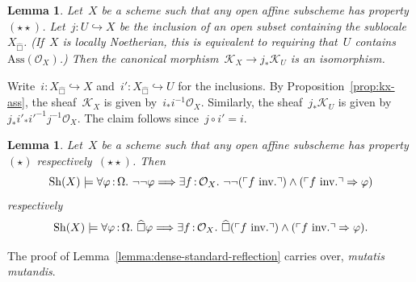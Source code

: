 \documentclass[10pt,reqno,a4paper]{amsbook}
\makeatletter
\theoremstyle{definition}
\theoremstyle{plain}
\newtheorem{lemma}[defn]{Lemma}
\theoremstyle{remark}
\renewcommand{\O}{\mathcal{O}}
\newcommand{\K}{\mathcal{K}}
\newcommand{\Sh}{\mathrm{Sh}}
\newcommand{\Ass}{\mathrm{Ass}}
\newcommand{\?}{\,{:}\,}
\renewcommand{\_}{\mathpunct{.}\,}
\newcommand{\speak}[1]{\ulcorner\text{\textnormal{#1}}\urcorner}
\newcommand{\sdense}{{\widehat\Box}}
\newcommand{\inv}{inv.\@}
\renewenvironment{proof}[1][\proofname]{\par
  \pushQED{\qed}%
  \normalfont \topsep6\p@\@plus6\p@\relax
  \trivlist
  \item[\hskip\labelsep
        \itshape
    #1\@addpunct{.}]\ignorespaces
}{%
  \popQED\endtrivlist\@endpefalse
}
\makeatother
\begin{document}
\begin{lemma}
Let~$X$ be a scheme such that any open affine subscheme has
property~$(\star\star)$. Let~$j : U \hookrightarrow X$ be the inclusion of an
open subset containing the sublocale~$X_\sdense$. (If~$X$ is locally
Noetherian, this is equivalent to requiring that~$U$ contains~$\Ass(\O_X)$.)
Then the canonical morphism~$\K_X \to j_* \K_U$ is an isomorphism.
\end{lemma}
\begin{proof}Write~$i : X_\sdense \hookrightarrow X$ and~$i' : X_\sdense
\hookrightarrow U$ for the inclusions. By Proposition~\ref{prop:kx-ass}, the
sheaf~$\K_X$ is given by~$i_* i^{-1} \O_X$. Similarly, the sheaf~$j_* \K_U$ is
given by~$j_* i'_* i'^{-1} j^{-1} \O_X$. The claim follows since~$j \circ i' =
i$.
\end{proof}

\begin{lemma}\label{lemma:dense-standard-reflection-generalized}
Let~$X$ be a scheme such that any open affine subscheme has
property~$(\star)$ respectively~$(\star\star)$. Then
\[ \Sh(X) \models \forall\varphi\?\Omega\_ \neg\neg\varphi \Longrightarrow \exists f\?\O_X\_
  \neg\neg(\speak{$f$ \inv}) \wedge (\speak{$f$ \inv} \Rightarrow \varphi) \]
respectively
\[ \Sh(X) \models \forall\varphi\?\Omega\_ \sdense\varphi \Longrightarrow \exists f\?\O_X\_
  \sdense(\speak{$f$ \inv}) \wedge (\speak{$f$ \inv} \Rightarrow \varphi). \]
\end{lemma}
\begin{proof}The proof of Lemma~\ref{lemma:dense-standard-reflection} carries
over, \emph{mutatis mutandis}.
\end{proof}
\end{document}

